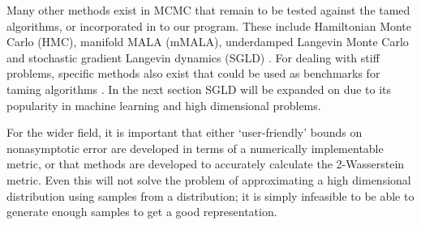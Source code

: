 Many other methods exist in MCMC that remain to be tested against the tamed algorithms, or incorporated in to our program. These include Hamiltonian Monte Carlo (HMC), manifold MALA (mMALA), underdamped Langevin Monte Carlo and stochastic gradient Langevin dynamics (SGLD) \cite{betancourt2017conceptual, Girolami2011,cheng2018,pitfalls}. For dealing with stiff problems, specific methods also exist that could be used as benchmarks for taming algorithms \cite{abdulle2013weak}. In the next section SGLD will be expanded on due to its popularity in machine learning and high dimensional problems. 

For the wider field, it is important that either `user-friendly' bounds on nonasymptotic error are developed in terms of a numerically implementable metric, or that methods are developed to accurately calculate the 2-Wasserstein metric. Even this will not solve the problem of approximating a high dimensional distribution using samples from a distribution; it is simply infeasible to be able to generate enough samples to get a good representation. 

